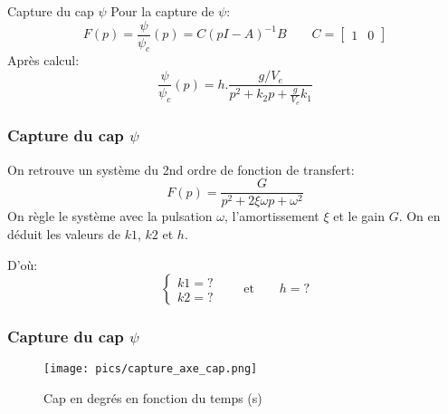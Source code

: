 \documentclass[tikz, footheight=2em]{beamer}
\begin{document}
\begin{frame}{Capture du cap \( \psi \)}
    Pour la capture de \( \psi \):
    \[
    F(p) = \frac{\psi}{\psi_c}(p) = C{(pI - A)}^{-1}B \qquad C=\begin{bmatrix}
            1 & 0
        \end{bmatrix}
    \] \pause{}
    Après calcul:
    \begin{equation*}
        \boxed{
            \frac{\psi}{\psi_c}(p) = h . \frac{g/V_e}{p^2 + k_2 p + \frac{g}{V_e}k_1}
        }
    \end{equation*}
\end{frame}

\begin{frame}
    \frametitle{Capture du cap \( \psi \)} \pause{}
    On retrouve un système du 2nd ordre de fonction de transfert:
    \[
    F(p) = \frac{G}{p^2 + 2 \xi \omega p + \omega ^2}
    \] \pause{}
    On règle le système avec la pulsation \( \omega \), l'amortissement \( \xi \)
    et le gain \( G \).
    On en déduit les valeurs de \( k1 \), \( k2 \) et \( h \).

    D'où:
    \[
    \boxed{
    \left \{
        \begin{array}{l}
            k1 = ? \\
            k2 = ?
        \end{array}
        \right. \qquad
        \text{et} \qquad
        h =?
    }
    \]
\end{frame}

\begin{frame}
	\frametitle{Capture du cap \(\psi\)}
	\begin{figure}
		\center
		\texttt{[image: pics/capture\_axe\_cap.png]}
		\caption{Cap en degr\'es en fonction du temps (s)}
	\end{figure}
\end{frame}
\end{document}
